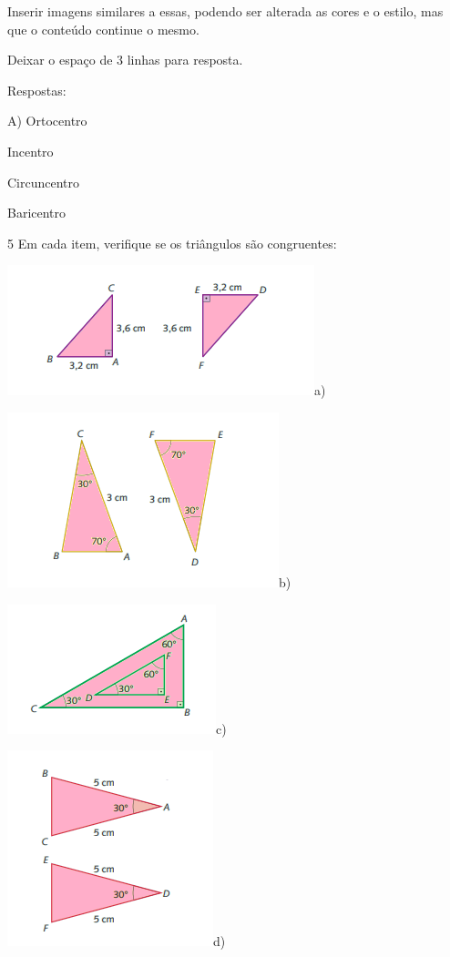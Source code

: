 Inserir imagens similares a essas, podendo ser alterada as cores e o
estilo, mas que o conteúdo continue o mesmo.

Deixar o espaço de 3 linhas para resposta.

Respostas:

A) Ortocentro

\item Incentro
\item Circuncentro
\item Baricentro

\num{5} Em cada item, verifique se os triângulos são congruentes:

\includegraphics[width=3\times 51042in,height=1\times 48958in]{./imgSAEB_8_MAT/media/image19.png}a)

\includegraphics[width=3\times 16667in,height=2\times 03958in]{./imgSAEB_8_MAT/media/image20.png}b)

\includegraphics[width=2\times 38542in,height=1\times 47917in]{./imgSAEB_8_MAT/media/image21.png}c)

\includegraphics[width=2\times 35417in,height=2\times 23958in]{./imgSAEB_8_MAT/media/image22.png}d)

